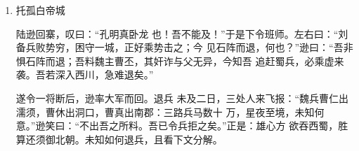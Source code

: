 \documentclass[UTF8,12pt,twoside,a4paper]{ctexart} %
\begin{document}
\begin{flushleft}
\begin{enumerate}
	\begin{enumerate}[(1)] %
\songti
\item 山坡上马忠引一军出
\item 一箭射中黄忠肩窝
\item 吴兵见忠中箭
\item 一齐来攻
	\end{enumerate}



\heiti {} \item  托孤白帝城

\songti {}
\indent\setlength{\parindent}{2em}%
陆逊回寨，叹曰：“孔明真卧龙
也！吾不能及！”于是下令班师。左右曰：“刘备兵败势穷，困守一城，正好乘势击之；今
见石阵而退，何也？”逊曰：“吾非惧石阵而退；吾料魏主曹丕，其奸诈与父无异，今知吾
追赶蜀兵，必乘虚来袭。吾若深入西川，急难退矣。”

遂令一将断后，逊率大军而回。退兵
未及二日，三处人来飞报：“魏兵曹仁出濡须，曹休出洞口，曹真出南郡：三路兵马数十
万，星夜至境，未知何意。”逊笑曰：“不出吾之所料。吾已令兵拒之矣。”正是：雄心方
欲吞西蜀，胜算还须御北朝。未知如何退兵，且看下文分解。

\end{enumerate}

\end{flushleft}%
\clearpage{\pagestyle{empty}\cleardoublepage}%
\end{document}
